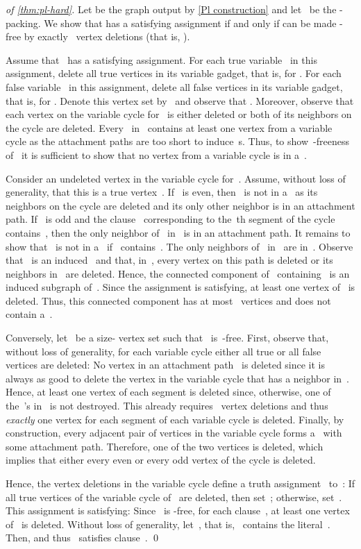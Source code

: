 \documentclass[envcountsame,numbook,smallextended]{svjour3}
\numberwithin{equation}{section}
\numberwithin{figure}{section}
\begin{document}
\begin{proof}[of \cref{thm:pl-hard}]
  Let  be the graph output by \cref{Pl construction} and let~ be
  the -packing.
We show that  has a satisfying assignment if and only if  can be made
  -free by exactly~ vertex deletions (that is, ).

  Assume that~ has a satisfying assignment.
  For each true variable~ in this assignment,
  delete all true vertices in its variable gadget,
  that is,  for .
  For each false variable~ in this assignment,
  delete all false vertices in its variable gadget,
  that is,  for .
  Denote this vertex set by~ and observe that .
  Moreover,
  observe that each vertex on the variable cycle for~
  is either deleted
  or both of its neighbors on the cycle are deleted.
  Every~ in~
  contains at least one vertex from a variable cycle
  as the attachment paths are too short to induce~s. Thus, to show~-freeness of~ it is sufficient to show that no vertex from a variable cycle is in a~.

  Consider an undeleted vertex in the variable cycle for~.
  Assume, without loss of generality,
  that this is a true vertex~.
  If~ is even, then~ is not in a~
  as its neighbors on the cycle are deleted
  and its only other neighbor is in an attachment path.
  If~ is odd and the
  clause~ corresponding to the~th segment of the cycle
  contains~, then the only neighbor of~ in~
  is in an attachment path. It remains to show that~ is not
  in a~ if~ contains~. The only neighbors
  of~ in~ are in~.
  Observe that~ is an induced~
  and that,
  in~,
  every vertex on this path is deleted
  or its neighbors in~ are deleted.
  Hence, the connected
  component of~ containing~
  is an induced subgraph
  of~. Since the assignment is satisfying, at least one
  vertex of~ is deleted. Thus, this connected component has at
  most~ vertices and does not contain a~.
 
  Conversely,
  let~ be a size- vertex set
  such that~ is~-free.
  First, observe that,
  without loss of generality,
  for each variable cycle
  either all true or all false vertices are deleted:
  No vertex in an attachment path~ is deleted
  since it is always as good to delete
  the vertex in the variable cycle
  that has a neighbor in~.
  Hence, at least one vertex of each segment is deleted
  since, otherwise,
  one of the~'s in~ is not destroyed.
  This already requires ~vertex deletions
  and thus \emph{exactly} one vertex for each segment
  of each variable cycle
  is deleted.
  Finally, by construction,
  every adjacent pair of vertices in the variable cycle
  forms a~ with some attachment path.
  Therefore, one of the two vertices is deleted,
  which implies that either every even or every odd vertex
  of the cycle is deleted. 

  Hence, the vertex deletions in the variable cycle
  define a truth assignment~ to~:
  If all true vertices of the variable cycle of~ are deleted, 
  then set~;
  otherwise, set~.
  This assignment is satisfying:
  Since ~is -free, for each clause~,
  at least one vertex  of~ is deleted.
  Without loss of generality,
  let~, that is,
  ~contains the literal~.
  Then,  and thus ~satisfies clause~.
\qed\end{proof}
\end{document}
